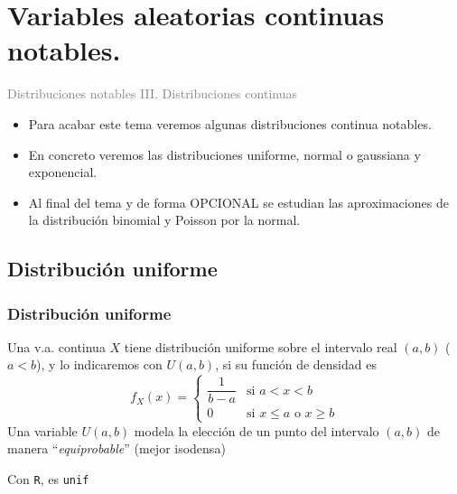 \documentclass[handout]{beamer}\usepackage[]{graphicx}\usepackage[]{color}
\title[\red{Matemáticas III GINF}]{}
\author[]{R. Alberich}
\date{}
\newcommand{\gray}[1]{\textcolor{gray}{#1}}
\renewcommand{\emph}[1]{{\color{red}#1}}
\renewcommand{\leq}{\leqslant}
\renewcommand{\geq}{\geqslant}
\theoremstyle{plain}
\theoremstyle{definition}
\begin{document}
\beamertemplatedotitem

\lstset{breaklines=true}
\lstset{basicstyle=\ttfamily}


\section{Variables aleatorias continuas notables.}

\begin{frame}
\vfill
\begin{center}
\gray{\LARGE Distribuciones notables III. Distribuciones continuas }
\end{center}
\vfill
\end{frame}


\begin{frame}
\begin{itemize}
\item Para acabar este tema veremos algunas distribuciones continua notables.
\item En concreto veremos las distribuciones uniforme, normal o gaussiana y exponencial.
\item Al final del tema y de forma \emph{OPCIONAL} se estudian las   aproximaciones de la distribución binomial y Poisson por la normal.
\end{itemize}
\end{frame}

\subsection{Distribución  uniforme}

\begin{frame}[fragile]
\frametitle{Distribución uniforme}
Una v.a. continua $X$ tiene \emph{distribución uniforme}
sobre el intervalo real
$(a,b)$ ($a<b$), y lo indicaremos con \emph{$U(a,b)$}, si  su función de densidad es
 $$
 f_X(x)=
 \left\{\begin{array}{ll}
\dfrac{1}{b-a} & \mbox{si } a<x<b\\[2ex] 0  & \mbox{si $x\leq a$ o $x\geq b$}
\end{array}
\right. $$ 
Una variable $U(a,b)$ modela la elección de  un punto del intervalo $(a,b)$ de manera ``\textsl{equiprobable}'' (mejor isodensa)
\medskip

Con {\tt R}, es \texttt{unif}

\end{frame}
\end{document}
